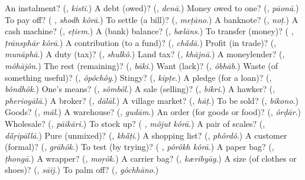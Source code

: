 \begin{tcolorbox}[breakable,colback=teal!4,colframe=teal!35!black,title={Before you move on}]
An instalment? (\textbf{}, \emph{kisti}.) A debt (owed)? (\textbf{}, \emph{denā}.) Money owed to one? (\textbf{}, \emph{pāonā}.) To pay off? (\textbf{ }, \emph{shodh kôrā}.) To settle (a bill)? (\textbf{}, \emph{meṭāno}.) A banknote? (\textbf{}, \emph{noṭ}.) A cash machine? (\textbf{}, \emph{eṭiem}.) A (bank) balance? (\textbf{}, \emph{bælāns}.) To transfer (money)? (\textbf{ }, \emph{ṭrānsphār kôrā}.) A contribution (to a fund)? (\textbf{}, \emph{chā̃dā}.) Profit (in trade)? (\textbf{}, \emph{munāphā}.) A duty (tax)? (\textbf{}, \emph{shulkô}.) Land tax? (\textbf{}, \emph{khājnā}.) A moneylender? (\textbf{}, \emph{môhājôn}.) The rest (remaining)? (\textbf{}, \emph{bāki}.) Want (lack)? (\textbf{}, \emph{ôbhāb}.) Waste (of something useful)? (\textbf{}, \emph{ôpôchôy}.) Stingy? (\textbf{}, \emph{kipṭe}.) A pledge (for a loan)? (\textbf{}, \emph{bôndhôk}.) One's means? (\textbf{}, \emph{sômbôl}.) A sale (selling)? (\textbf{}, \emph{bikri}.) A hawker? (\textbf{}, \emph{pherioyālā}.) A broker? (\textbf{}, \emph{dālāl}.) A village market? (\textbf{}, \emph{hāṭ}.) To be sold? (\textbf{}, \emph{bikono}.) Goods? (\textbf{}, \emph{māl}.) A warehouse? (\textbf{}, \emph{gudām}.) An order (for goods or food)? (\textbf{}, \emph{ôrḍār}.) Wholesale? (\textbf{}, \emph{pāikāri}.) To stock up? (\textbf{ }, \emph{môjut kôrā}.) A pair of scales? (\textbf{}, \emph{dā̃ṛipāllā}.) Pure (unmixed)? (\textbf{}, \emph{khā̃ṭi}.) A shopping list? (\textbf{}, \emph{phôrdô}.) A customer (formal)? (\textbf{}, \emph{grāhôk}.) To test (by trying)? (\textbf{ }, \emph{pôrôkh kôrā}.) A paper bag? (\textbf{}, \emph{ṭhongā}.) A wrapper? (\textbf{}, \emph{moṛôk}.) A carrier bag? (\textbf{}, \emph{kæribyāg}.) A size (of clothes or shoes)? (\textbf{}, \emph{sāij}.) To palm off? (\textbf{}, \emph{gôchhāno}.)
\end{tcolorbox}
